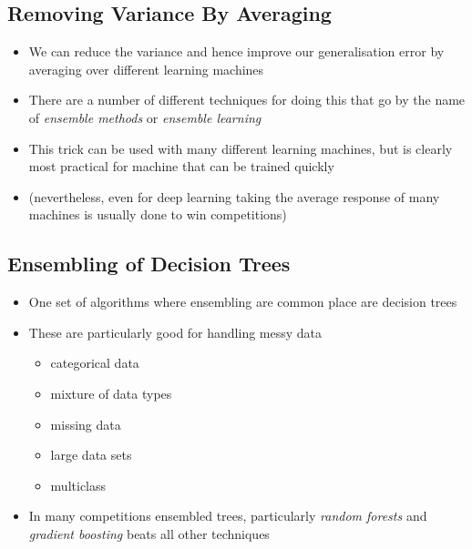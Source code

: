 \setcounter{outlineitem}{1}

\Outline %

\begin{slide}
\section{Removing Variance By Averaging}

\begin{PauseHighLight}
  \begin{itemize}
  \item We can reduce the variance and hence improve our generalisation
    error by averaging over different learning machines\pause
  \item There are a number of different techniques for doing this that
    go by the name of \emph{ensemble methods} or \emph{ensemble
      learning}\pause
  \item This trick can be used with many different learning machines,
    but is clearly most practical for machine that can be trained
    quickly\pause
  \item (nevertheless, even for deep learning taking the average
    response of many machines is usually done to win competitions)\pauseb
  \end{itemize}
\end{PauseHighLight}

\end{slide}


\begin{slide}
\section{Ensembling of Decision Trees}

\begin{PauseHighLight}
  \begin{itemize}
  \item One set of algorithms where ensembling are common place are
    decision trees\pause
  \item These are particularly good for handling messy data
    \begin{itemize}
    \item categorical data\pause
    \item mixture of data types\pause
    \item missing data\pause
    \item large data sets\pause
    \item multiclass\pause
    \end{itemize}
  \item In many competitions ensembled trees, particularly
    \textit{random forests} and \textit{gradient boosting} beats all
    other techniques\pause
  \end{itemize}
\end{PauseHighLight}

\end{slide}

